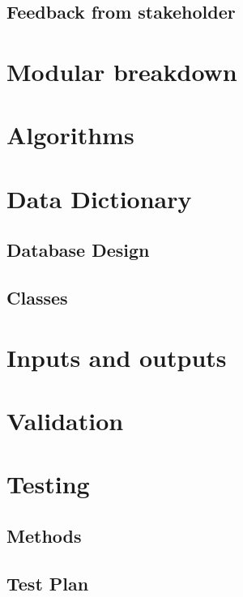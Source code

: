 \documentclass[11pt,a4paper]{report}
\begin{document}
\subsection{Feedback from stakeholder}

\section{Modular breakdown}


\pagebreak
\section{Algorithms}


\pagebreak
\section{Data Dictionary}

\subsection{Database Design}


\pagebreak
\subsection{Classes}


\section{Inputs and outputs}

\section{Validation}

\section{Testing}

\subsection{Methods}

\subsection{Test Plan}
\end{document}
